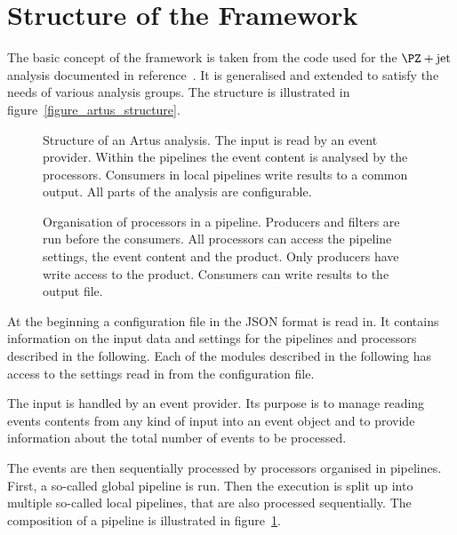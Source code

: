 \documentclass[3p]{elsarticle}
\begin{document}
\section{Structure of the Framework \label{section_artus_structure}}

The basic concept of the framework is taken from the code used for the $\PZ+\text{jet}$ analysis documented in reference~\cite{joram_phd}. It is generalised and extended to satisfy the needs of various analysis groups. The structure is illustrated in figure~\ref{figure_artus_structure}.

\begin{figure}[p]
\centering 
\caption[Structure of an Artus analysis.]{Structure of an Artus analysis. The input is read by an event provider. Within the pipelines the event content is analysed by the processors. Consumers in local pipelines write results to a common output. All parts of the analysis are configurable.}
\label{figure_artus_structure}

\vspace{10ex}

\centering 
\caption[Organisation of processors in a pipeline.]{Organisation of processors in a pipeline. Producers and filters are run before the consumers. All processors can access the pipeline settings, the event content and the product. Only producers have write access to the product. Consumers can write results to the output file.}
\label{figure_artus_pipeline}
\end{figure}

At the beginning a configuration file in the JSON format is read in. It contains information on the input data and settings for the pipelines and processors described in the following. Each of the modules described in the following has access to the settings read in from the configuration file.

The input is handled by an event provider. Its purpose is to manage reading events contents from any kind of input into an event object and to provide information about the total number of events to be processed.

The events are then sequentially processed by processors organised in pipelines. First, a so-called global pipeline is run. Then the execution is split up into multiple so-called local pipelines, that are also processed sequentially. The composition of a pipeline is illustrated in figure~\ref{figure_artus_pipeline}.
\end{document}
